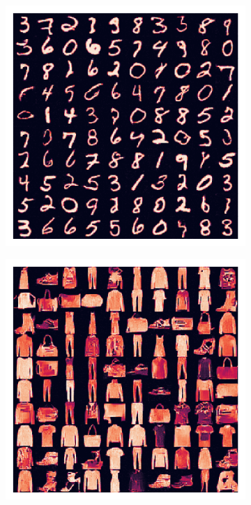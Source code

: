 \documentclass{article}
\begin{document}
\begin{figure}[!t]
\centering
\begin{subfigure}{0.22\textwidth}
\centering
\includegraphics[width=\textwidth]{figures/mnist_cebm_buffer_samples.pdf}
\end{subfigure} %
\begin{subfigure}{0.22\textwidth}
\centering
\includegraphics[width=\textwidth]{figures/fmnist_cebm_samples.pdf}

\end{subfigure}
\end{figure}
\end{document}
